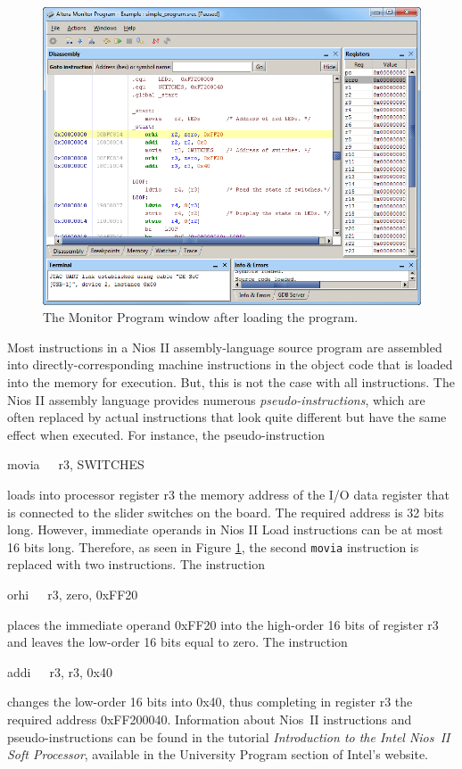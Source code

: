 \documentclass[11pt, twoside, pdftex]{article}
\begin{document}
\begin{figure}[H]
   \begin{center}
      \includegraphics[scale=0.6]{screenshots/figure15.png}
   \end{center}
   \caption{The Monitor Program window after loading the program.} 
   \label{fig:AMP_afterprogramload_nios}
\end{figure}

Most instructions in a Nios II assembly-language source program
are assembled into directly-corresponding machine instructions in
the object code that is loaded into the memory for execution.
But, this is not the case with all instructions. The Nios II
assembly language provides numerous {\it pseudo-instructions},
which are often replaced by actual instructions that look
quite different but have the same effect when executed.
For instance, the pseudo-instruction
\begin{center}
movia~~~r3, SWITCHES
\end{center}
\noindent
loads into processor register r3 the memory address of the I/O
data register that is connected to the slider switches on the
board. The required address is 32 bits long. However, immediate
operands in Nios II Load instructions can be at most 16 bits
long. Therefore, as seen in Figure \ref{fig:AMP_afterprogramload_nios}, 
the second \texttt {movia} instruction is replaced with two
instructions. The instruction 
\begin{center}
orhi~~~r3, zero, 0xFF20
\end{center}
\noindent
places the immediate operand 0xFF20 into the high-order 16 bits
of register r3 and leaves the low-order 16 bits equal to zero.
The instruction
\begin{center}
addi~~~r3, r3, 0x40
\end{center}
\noindent
changes the low-order 16 bits into 0x40, thus completing in
register r3 the required address 0xFF200040.
Information about Nios~II instructions and
pseudo-instructions can be found in the tutorial
\emph{Introduction to the Intel Nios~II Soft Processor}, available in the University Program section of Intel's website.
\end{document}
